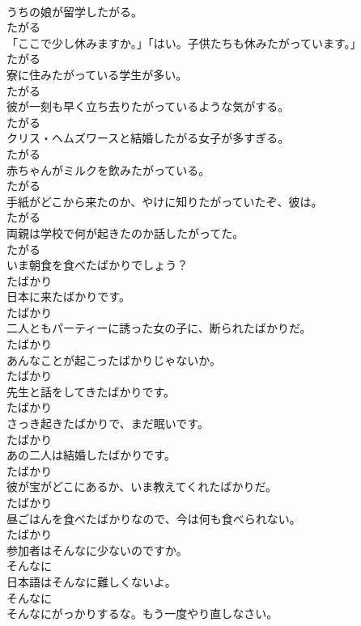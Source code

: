 \documentclass[8pt]{extreport}
\begin{document}
\begin{CJK}{UTF8}{min}
\\	うちの娘が留学したがる。	
\\	たがる
\\	「ここで少し休みますか。」「はい。子供たちも休みたがっています。」	
\\	たがる
\\	寮に住みたがっている学生が多い。	
\\	たがる
\\	彼が一刻も早く立ち去りたがっているような気がする。	
\\	たがる
\\	クリス・ヘムズワースと結婚したがる女子が多すぎる。	
\\	たがる
\\	赤ちゃんがミルクを飲みたがっている。	
\\	たがる
\\	手紙がどこから来たのか、やけに知りたがっていたぞ、彼は。	
\\	たがる
\\	両親は学校で何が起きたのか話したがってた。	
\\	たがる
\\	いま朝食を食べたばかりでしょう？	
\\	たばかり
\\	日本に来たばかりです。	
\\	たばかり
\\	二人ともパーティーに誘った女の子に、断られたばかりだ。	
\\	たばかり
\\	あんなことが起こったばかりじゃないか。	
\\	たばかり
\\	先生と話をしてきたばかりです。	
\\	たばかり
\\	さっき起きたばかりで、まだ眠いです。	
\\	たばかり
\\	あの二人は結婚したばかりです。	
\\	たばかり
\\	彼が宝がどこにあるか、いま教えてくれたばかりだ。	
\\	たばかり
\\	昼ごはんを食べたばかりなので、今は何も食べられない。	
\\	たばかり
\\	参加者はそんなに少ないのですか。	
\\	そんなに
\\	日本語はそんなに難しくないよ。	
\\	そんなに
\\	そんなにがっかりするな。もう一度やり直しなさい。	

\end{CJK}
\end{document}
